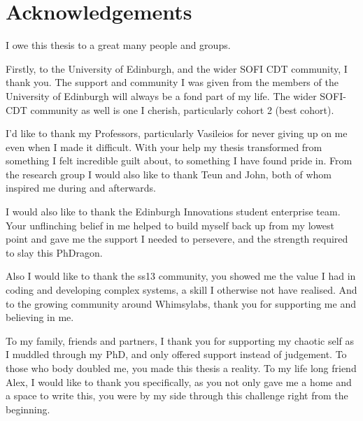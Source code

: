 \section{Acknowledgements}

\noindent

\normalsize

I owe this thesis to a great many people and groups. 

Firstly, to the University of Edinburgh, and the wider SOFI CDT community, I thank you. The support and community I was given from the members of the University of Edinburgh will always be a fond part of my life. The wider SOFI-CDT community as well is one I cherish, particularly cohort 2 (best cohort).

I'd like to thank my Professors, particularly Vasileios for never giving up on me even when I made it difficult. With your help my thesis transformed from something I felt incredible guilt about, to something I have found pride in. From the research group I would also like to thank Teun and John, both of whom inspired me during and afterwards.

I would also like to thank the Edinburgh Innovations student enterprise team. Your unflinching belief in me helped to build myself back up from my lowest point and gave me the support I needed to persevere, and the strength required to slay this PhDragon.

Also I would like to thank the ss13 community, you showed me the value I had in coding and developing complex systems, a skill I otherwise not have realised. And to the growing community around Whimsylabs, thank you for supporting me and believing in me.

To my family, friends and partners, I thank you for supporting my chaotic self as I muddled through my PhD, and only offered support instead of judgement. To those who body doubled me, you made this thesis a reality. To my life long friend Alex, I would like to thank you specifically, as you not only gave me a home and a space to write this, you were by my side through this challenge right from the beginning. 